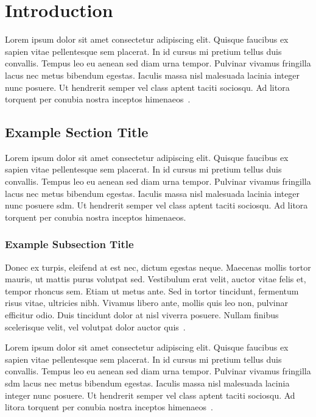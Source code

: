 \chapter{Introduction}

Lorem ipsum dolor sit amet consectetur adipiscing elit. Quisque faucibus ex sapien vitae pellentesque sem placerat. In id cursus mi pretium tellus duis convallis. Tempus leo eu aenean sed diam urna tempor. Pulvinar vivamus fringilla lacus nec metus bibendum egestas. Iaculis massa nisl malesuada lacinia integer nunc posuere. Ut hendrerit semper vel class aptent taciti sociosqu. Ad litora torquent per conubia nostra inceptos himenaeos~\cite{Topic1_Author_Year}.

\section{Example Section Title}

Lorem ipsum dolor sit amet consectetur adipiscing elit. Quisque faucibus ex sapien vitae pellentesque sem placerat. In id cursus mi pretium tellus duis convallis. Tempus leo eu aenean sed diam urna tempor. Pulvinar vivamus fringilla lacus nec metus bibendum egestas. Iaculis massa nisl malesuada lacinia integer nunc posuere \gls{sdm}. Ut hendrerit semper vel class aptent taciti sociosqu. Ad litora torquent per conubia nostra inceptos himenaeos.

\subsection{Example Subsection Title}

Donec ex turpis, eleifend at est nec, dictum egestas neque. Maecenas mollis tortor mauris, ut mattis purus volutpat sed. Vestibulum erat velit, auctor vitae felis et, tempor rhoncus sem. Etiam ut metus ante. Sed in tortor tincidunt, fermentum risus vitae, ultricies nibh. Vivamus libero ante, mollis quis leo non, pulvinar efficitur odio. Duis tincidunt dolor at nisl viverra posuere. Nullam finibus scelerisque velit, vel volutpat dolor auctor quis~\cite{Topic2_Author_Year}.

Lorem ipsum dolor sit amet consectetur adipiscing elit. Quisque faucibus ex sapien vitae pellentesque sem placerat. In id cursus mi pretium tellus duis convallis. Tempus leo eu aenean sed diam urna tempor. Pulvinar vivamus fringilla \gls{sdm} lacus nec metus bibendum egestas. Iaculis massa nisl malesuada lacinia integer nunc posuere. Ut hendrerit semper vel class aptent taciti sociosqu. Ad litora torquent per conubia nostra inceptos himenaeos~.

